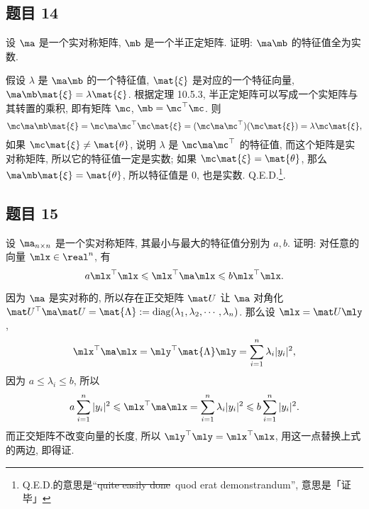 \newpage
\subsection*{ 题目 14 }
\begin{problem*}
设 $\ma$ 是一个实对称矩阵, $\mb$ 是一个半正定矩阵. 证明: $\ma\mb$ 的特征值全为实数.
\end{problem*}
\begin{solution}
假设 $\lambda$ 是 $\ma\mb$ 的一个特征值, $\mat{\xi}$ 是对应的一个特征向量, $\ma \mb \mat{\xi} = \lambda \mat{\xi}$. 根据定理 10.5.3, 半正定矩阵可以写成一个实矩阵与其转置的乘积, 即有矩阵 $\mc$, $\mb = \mc^\top \mc$. 则
\[
\mc \ma \mb \mat{\xi} = \mc \ma \mc^\top \mc \mat{\xi} = (\mc \ma \mc^\top)(\mc \mat{\xi}) = \lambda \mc \mat{\xi}, 
\] 
如果 $\mc \mat{\xi} \not= \mat{\theta}$, 说明 $\lambda$ 是 $\mc \ma \mc^\top$ 的特征值, 而这个矩阵是实对称矩阵, 所以它的特征值一定是实数; 如果 $\mc \mat{\xi} = \mat{\theta}$, 那么 $\ma \mb \mat{\xi} = \mat{\theta}$, 所以特征值是 $0$, 也是实数. Q.E.D.\footnote{Q.E.D.的意思是``\sout{quite easily done}\ quod erat demonstrandum'', 意思是「证毕」}.
\end{solution}

\subsection*{ 题目 15 }
\begin{problem*}
设 $\ma_{n \times n}$ 是一个实对称矩阵, 其最小与最大的特征值分别为 $a, b$. 证明: 对任意的向量 $\mlx \in \real^n$, 有
\[
a \mlx^\top \mlx \leqslant \mlx^\top \ma \mlx \leqslant b \mlx^\top \mlx.
\]
\end{problem*}
\begin{solution}
因为 $\ma$ 是实对称的, 所以存在正交矩阵 $\muu$ 让 $\ma$ 对角化 $\muu^\top \ma \muu = \mat{\Lambda} := \mathrm{diag}(\lambda_1, \lambda_2, \cdots, \lambda_n)$. 那么设 $\mlx = \muu \mly$,
\[
\mlx^\top \ma \mlx = \mly^\top \mat{\Lambda} \mly = \sum_{i = 1}^{n} \lambda_i |y_i|^2,
\]
因为 $a \leqslant \lambda_i \leqslant b$, 所以
\[
    a \sum_{i = 1}^{n} |y_i|^2 \leqslant \mlx^\top \ma \mlx = \sum_{i = 1}^{n} \lambda_i |y_i|^2 \leqslant b \sum_{i = 1}^{n} |y_i|^2.
\]
而正交矩阵不改变向量的长度, 所以 $\mly^\top \mly = \mlx^\top \mlx$, 用这一点替换上式的两边, 即得证.
\end{solution}

\newcommand{\quadform}[2]{{{#1}^{\top}} {#2} {#1}}

